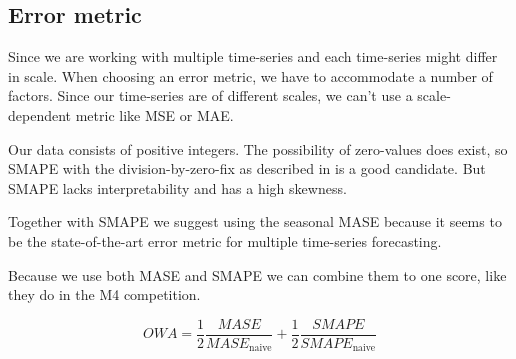 \subsection{Error metric}



Since we are working with multiple time-series and each time-series might differ in scale.
When choosing an error metric, we have to accommodate a number of factors.
Since our time-series are of different scales, we can't use a scale-dependent metric
like MSE or MAE.

Our data consists of positive integers. The possibility of zero-values does exist,
so SMAPE with the division-by-zero-fix as described in  is a good candidate.
But SMAPE lacks interpretability and has a high skewness.

Together with SMAPE we suggest using the seasonal MASE because it seems to be the
state-of-the-art error metric for multiple time-series forecasting.

Because we use both MASE and SMAPE we can combine them to one score, like
they do in the M4 competition.

\begin{equation}
  \label{eq:OWA}
  OWA = \frac{1}{2} \frac{MASE}{MASE_{\text{naive}}} + \frac{1}{2} \frac{SMAPE}{SMAPE_{\text{naive}}}
\end{equation}
